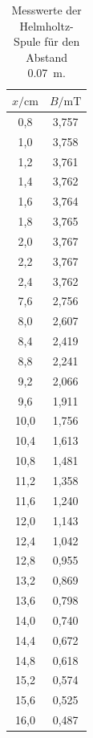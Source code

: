 \begin{table}[H]
  \centering
  \caption{Messwerte der Helmholtz-Spule für den Abstand \SI{0.07}{\meter}.}
  \label{tab:3}
  \begin{tabular}{c c}
    \toprule
    $x/\si{\centi\meter}$ & $B/\si{\milli\tesla}$ \\
    \midrule
     0,8 & 3,757 \\
     1,0 & 3,758 \\
     1,2 & 3,761 \\
     1,4 & 3,762 \\
     1,6 & 3,764 \\
     1,8 & 3,765 \\
     2,0 & 3,767 \\
     2,2 & 3,767 \\
     2,4 & 3,762 \\
     7,6 & 2,756 \\
     8,0 & 2,607 \\
     8,4 & 2,419 \\
     8,8 & 2,241 \\
     9,2 & 2,066 \\
     9,6 & 1,911 \\
    10,0 & 1,756 \\
    10,4 & 1,613 \\
    10,8 & 1,481 \\
    11,2 & 1,358 \\
    11,6 & 1,240 \\
    12,0 & 1,143 \\
    12,4 & 1,042 \\
    12,8 & 0,955 \\
    13,2 & 0,869 \\
    13,6 & 0,798 \\
    14,0 & 0,740 \\
    14,4 & 0,672 \\
    14,8 & 0,618 \\
    15,2 & 0,574 \\
    15,6 & 0,525 \\
    16,0 & 0,487 \\
    \bottomrule
  \end{tabular}
\end{table}

